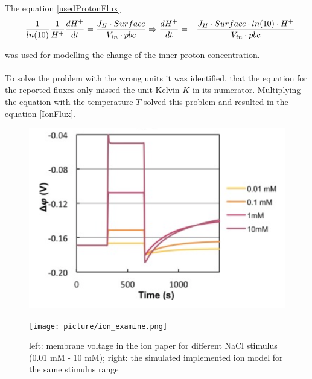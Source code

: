 The equation \ref{usedProtonFlux} 
\begin{equation}\label{usedProtonFlux}
- \frac{1}{ln(10)} \frac{1}{H^+}\frac{dH^+}{dt} = \frac{J_H \cdot Surface}{V_{in} \cdot pbc}\\
\Rightarrow \frac{dH^+}{dt}=-\frac{J_H \cdot Surface \cdot ln(10) \cdot H^+}{V_{in} \cdot pbc}
\end{equation}

was used for modelling the change of the inner proton concentration.\\\\
To solve the problem with the wrong units it was identified, that the equation for the reported fluxes only missed the unit Kelvin $K$ in its numerator. Multiplying the equation with the temperature $T$ solved this problem and resulted in the equation \ref{IonFlux}.
\begin{figure}[htbp]
	
	\begin{minipage}{0,5\textwidth}
		
		\includegraphics[width=\textwidth]{picture/Ion_Paper.png}
		
		\label{IonPaper} 
	\end{minipage}
	\begin{minipage}{0,5\textwidth}
		
		\texttt{[image: picture/ion\_examine.png]}
		
		\label{IonImplemented} 
	\end{minipage}
	\caption{left: membrane voltage in the ion paper for different NaCl stimulus (0.01 mM - 10 mM); right: the simulated implemented ion model for the same stimulus range }
\end{figure}


